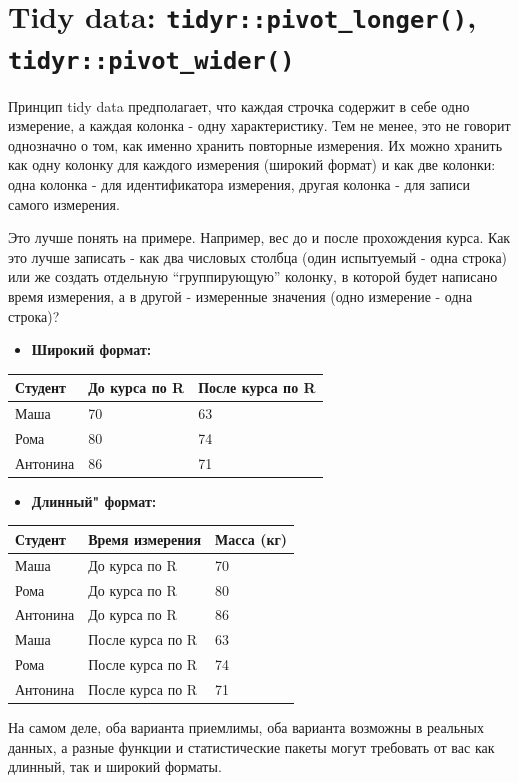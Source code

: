 \documentclass[]{book}
\providecommand{\tightlist}{%
  \setlength{\itemsep}{0pt}\setlength{\parskip}{0pt}}
\begin{document}
\section{\texorpdfstring{Tidy data: \texttt{tidyr::pivot\_longer()},
\texttt{tidyr::pivot\_wider()}}{Tidy data: tidyr::pivot\_longer(), tidyr::pivot\_wider()}}\label{tidy_data}

Принцип tidy data предполагает, что каждая строчка содержит в себе одно
измерение, а каждая колонка - одну характеристику. Тем не менее, это не
говорит однозначно о том, как именно хранить повторные измерения. Их
можно хранить как одну колонку для каждого измерения (широкий формат) и
как две колонки: одна колонка - для идентификатора измерения, другая
колонка - для записи самого измерения.

Это лучше понять на примере. Например, вес до и после прохождения курса.
Как это лучше записать - как два числовых столбца (один испытуемый -
одна строка) или же создать отдельную ``группирующую'' колонку, в
которой будет написано время измерения, а в другой - измеренные значения
(одно измерение - одна строка)?

\begin{itemize}
\tightlist
\item
  \textbf{Широкий формат:}
\end{itemize}

\begin{longtable}[]{@{}lll@{}}
\toprule
Студент & До курса по R & После курса по R\tabularnewline
\midrule
\endhead
Маша & 70 & 63\tabularnewline
Рома & 80 & 74\tabularnewline
Антонина & 86 & 71\tabularnewline
\bottomrule
\end{longtable}

\begin{itemize}
\tightlist
\item
  \textbf{Длинный" формат:}
\end{itemize}

\begin{longtable}[]{@{}lll@{}}
\toprule
Студент & Время измерения & Масса (кг)\tabularnewline
\midrule
\endhead
Маша & До курса по R & 70\tabularnewline
Рома & До курса по R & 80\tabularnewline
Антонина & До курса по R & 86\tabularnewline
Маша & После курса по R & 63\tabularnewline
Рома & После курса по R & 74\tabularnewline
Антонина & После курса по R & 71\tabularnewline
\bottomrule
\end{longtable}

На самом деле, оба варианта приемлимы, оба варианта возможны в реальных
данных, а разные функции и статистические пакеты могут требовать от вас
как длинный, так и широкий форматы.
\end{document}

